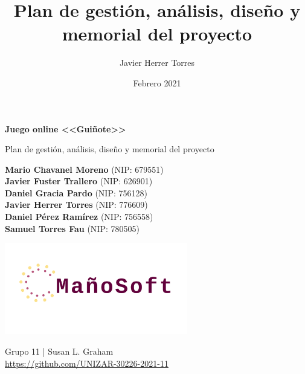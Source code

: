 \documentclass{article}
\title{Plan de gestión, análisis, diseño y memorial del proyecto}
\author{Javier Herrer Torres}
\date{Febrero 2021}
\begin{document}
\begin{titlepage}
    \begin{center}
        \vspace*{1cm}
            
        \Huge
        \textbf{Juego online <<Guiñote>>}
            
        \vspace{0.5cm}
        \LARGE
		Plan de gestión, análisis, diseño y memorial del proyecto
		
        \vspace{1.5cm}
            
        \textbf{Mario Chavanel Moreno} (NIP: 679551)\\
        \textbf{Javier Fuster Trallero} (NIP: 626901)\\
        \textbf{Daniel Gracia Pardo} (NIP: 756128)\\
        \textbf{Javier Herrer Torres} (NIP: 776609)\\
        \textbf{Daniel Pérez Ramírez} (NIP: 756558)\\
        \textbf{Samuel Torres Fau} (NIP: 780505)
        
        \vfill
            
    	\includegraphics[width=0.6\textwidth]{./images/logo.png}
            
        \vspace{1.5cm}
            
        
         Grupo 11 | Susan L. Graham\\
        \href{https://github.com/UNIZAR-30226-2021-11}{https://github.com/UNIZAR-30226-2021-11}
            
        \vspace{1.5cm}
 
    \end{center}
\end{titlepage}

\tableofcontents
\end{document}
